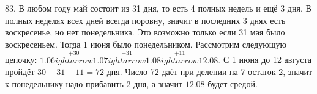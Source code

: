 83. В любом году май состоит из 31 дня, то есть 4 полных недель и ещё 3 дня. В полных неделях всех дней всегда поровну, значит в последних 3 днях есть воскресенье, но нет понедельника. Это возможно только если 31 мая было воскресеньем. Тогда 1 июня было понедельником. Рассмотрим следующую цепочку:
$1.06\stackrel{+30}{
ightarrow}1.07\stackrel{+31}{
ightarrow}1.08\stackrel{+11}{
ightarrow}12.08.$ С 1 июня до 12 августа пройдёт $30+31+11=72$ дня. Число 72 даёт при делении на 7 остаток 2, значит к понедельнику надо прибавить 2 дня, а значит $12.08$ будет средой.\\
